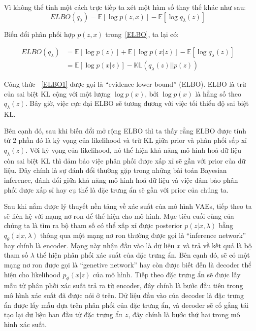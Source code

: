         Vì không thể tính một cách trực tiếp ta xét một hàm số thay thế khác như sau:
        \begin{equation}
        \label{ELBO}
            ELBO(q_\lambda) = \mathbb{E}[\log p(z,x)] - \mathbb{E}[\log q_\lambda(z)]
        \end{equation}

        Biến đổi phân phối hợp $p(z,x)$ trong~\ref{ELBO}, ta lại có: 

        \begin{equation} \label{ELBO1}
            \begin{split}
                ELBO(q_\lambda) & = \mathbb{E}[\log p(z)]+ \mathbb{E}[\log p(x|z)] - \mathbb{E}[\log q_\lambda(z)]\\
                                & = \mathbb{E}[\log p(x|z)] - \mathbb{KL}( q_\lambda(z)|| p(z))
            \end{split}
        \end{equation}

        Công thức ~\ref{ELBO1} được gọi là ``evidence lower bound'' (ELBO).
        ELBO là trừ của sai biệt KL cộng với một lượng $\log p(x)$, bởi $\log p(x)$ là hằng số theo $q_\lambda(z)$.
        Bây giờ, việc cực đại ELBO sẽ tương đương với việc tối thiểu độ sai biệt KL.
        
        Bên cạnh đó, sau khi biến đổi mở rộng ELBO thì ta thấy rằng ELBO được tính từ 2 phần đó là kỳ vọng của likelihood và trừ KL giữa prior và phân phối sấp xỉ $q_\lambda(z)$.
        Với kỳ vọng của likelihood, nó thể hiện khả năng mô hình hoá dữ liệu còn sai biệt KL thì đảm bảo việc phân phối được xấp xỉ sẽ gần với prior của  dữ liệu.
        Đây chính là sự đánh đổi thường gặp trong những bài toán Bayesian inference, đánh đổi giữa khả năng mô hình hoá dữ liệu và việc đảm bảo phân phối được xấp sỉ hay cụ thể là đặc trưng ẩn sẽ gần với prior của chúng ta.

        
        Sau khi nắm được lý thuyết nền tảng về xác suất của mô hình VAEs, tiếp theo ta sẽ liên hệ với mạng nơ ron để thể hiện cho mô hình.
        Mục tiêu cuối cùng của chúng ta là tìm ra bộ tham số có thể xấp xỉ được posterior $ p(z|x,\lambda)$ bằng $q_\theta(z|x,\lambda) $ thông qua một mạng nơ ron thường được gọi là  ``inference network'' hay chính là encoder. Mạng này nhận đầu vào là dữ liệu $x$ và trả về kết quả là bộ tham số $\lambda$ thể hiện phân phối xác suất của đặc trưng ẩn. 
        Bên cạnh đó, sẽ có một mạng nơ ron được gọi là ``genetive network'' hay còn được biết đến là decoder thể hiện cho likelihood $p_{\phi}(x|z)$ của mô hình. 
        Tiếp theo đặc trưng ẩn sẽ được lấy mẫu từ phân phối xác suất trả ra từ encoder, đây chính là bước đầu tiên trong mô hình xác suất đã được nói ở  trên.
        Dữ liệu đầu vào của decoder là đặc trưng ẩn được lấy mẫu dựa trên phân phối của đặc trưng ẩn, và decoder sẽ cố gắng tái tạo lại dữ liệu ban đầu từ đặc trưng ẩn $z$, đây chính là bước thứ hai trong mô hình xác suất.
        
